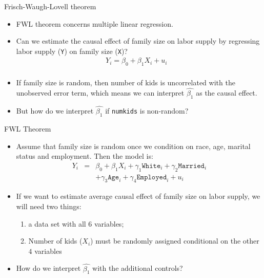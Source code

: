 \documentclass{beamer}
\begin{document}
\begin{frame}{Frisch-Waugh-Lovell theorem}

	\begin{itemize}
	\item FWL theorem concerns multiple linear regression.
	\item Can we estimate the causal effect of family size on labor supply by regressing labor supply (\texttt{Y}) on family size (\texttt{X})?
		\begin{align*}
		Y_i = \beta_0 + \beta_1 X_i + u_i&\\
		\end{align*}
	\item If family size is random, then number of kids is uncorrelated with the unobserved error term, which means we can interpret $\widehat{\beta_1}$ as the causal effect.
	\item But how do we interpret $\widehat{\beta_1}$ if \texttt{numkids} is non-random?  
	\end{itemize}
\end{frame}


\begin{frame}{FWL Theorem}
	
	\begin{itemize}
	\item Assume that family size is random once we condition on race, age, marital status and employment.  Then the model is:
		\begin{eqnarray*}
Y_i &=& \beta_0 + \beta_1 X_i + \gamma_1 \texttt{White}_i + \gamma_2 \texttt{Married}_i \\
		& & + \gamma_3 \texttt{Age}_i + \gamma_4 \texttt{Employed}_i + u_i
		\end{eqnarray*}
	\item If we want to estimate average causal effect of family size on labor supply, we will need two things: 
		\begin{enumerate}
		\item a data set with all $6$ variables; 
		\item Number of kids ($X_i$) must be randomly assigned conditional on the other $4$ variables
		\end{enumerate}
	\item How do we interpret $\widehat{\beta_1}$ with the additional controls?
	\end{itemize}
	
\end{frame}
\end{document}
